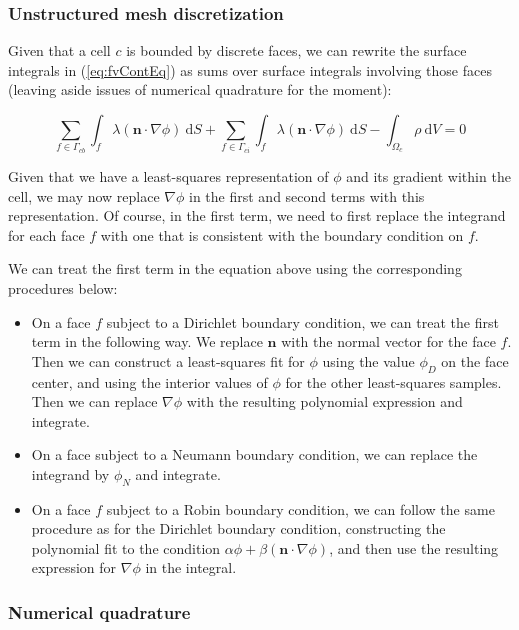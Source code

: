 \documentclass[12pt]{article}
\newcommand{\refEq}[1]{(\ref{eq:#1})}
\renewcommand{\vec}[1]{\mathbf{#1}}
\newcommand{\grad}[1]{\nabla#1}
\newcommand{\dV}{~\mathrm{d}V}
\newcommand{\dS}{~\mathrm{d}S}
\begin{document}
\subsubsection*{Unstructured mesh discretization}

Given that a cell $c$ is bounded by discrete faces, we can rewrite the surface integrals in \refEq{fvContEq} as sums over 
surface integrals involving those faces (leaving aside issues of numerical quadrature for the moment):

\begin{equation}
\sum_{f \in \Gamma_{cb}}\int_f \lambda (\vec{n}\cdot\grad{\phi}) \dS + 
\sum_{f \in \Gamma_{ci}}\int_f \lambda (\vec{n}\cdot\grad{\phi}) \dS - \int_{\Omega_c} \rho \dV = 0 
\end{equation}

\noindent
Given that we have a least-squares representation of $\phi$ and its gradient within the cell, we may now replace $\grad{\phi}$ 
in the first and second terms with this representation. Of course, in the first term, we need to first replace the 
integrand for each face $f$ with one that is consistent with the boundary condition on $f$.

We can treat the first term in the equation above using the corresponding procedures below:

\begin{itemize}
 \item On a face $f$ subject to a Dirichlet boundary condition, we can treat the first term in the following way. We replace $\vec{n}$ 
  with the normal vector for the face $f$. Then we can construct a least-squares fit for $\phi$ using the value $\phi_D$ on the face 
  center, and using the interior values of $\phi$ for the other least-squares samples. Then we can replace $\grad{\phi}$ with the 
  resulting polynomial expression and integrate.
 \item On a face subject to a Neumann boundary condition, we can replace the integrand by $\phi_N$ and integrate.
 \item On a face $f$ subject to a Robin boundary condition, we can follow the same procedure as for the Dirichlet boundary condition, 
  constructing the polynomial fit to the condition $\alpha\phi + \beta(\vec{n}\cdot\grad{\phi})$, and then use the resulting 
  expression for $\grad{\phi}$ in the integral.
\end{itemize}

\subsubsection*{Numerical quadrature}
\end{document}
